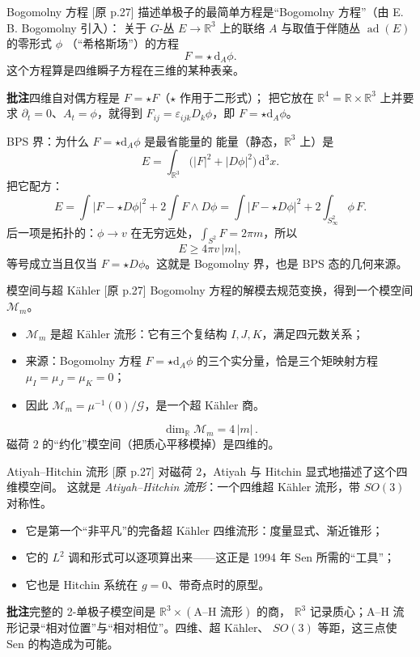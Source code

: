 \documentclass[aspectratio=169,12pt]{ctexbeamer}
\newcommand{\RR}{\mathbb{R}}
\newcommand{\cM}{\mathcal{M}}
\newcommand{\dd}{\mathrm{d}}
\newcommand{\ad}{\operatorname{ad}}
\newcommand{\srcp}[1]{{\color{black!40}\scriptsize[原 p.#1]}}
\begin{document}
\begin{frame}{Bogomolny 方程}
  \srcp{27} 描述单极子的最简单方程是“Bogomolny 方程”（由 E. B. Bogomolny 引入）：
  关于 $G$-丛 $E\to\RR^3$ 上的联络 $A$ 与取值于伴随丛 $\ad(E)$ 的零形式 $\phi$
  （“希格斯场”）的方程
  \[
    F=\star\,\dd_A\phi .
  \]
  这个方程算是四维瞬子方程在三维的某种表亲。
  \begin{beizhu}
  \textbf{批注}\quad 四维自对偶方程是 $F=\star F$（$\star$ 作用于二形式）；
  把它放在 $\RR^4=\RR\times\RR^3$ 上并要求 $\partial_t=0$、$A_t=\phi$，就得到
  $F_{ij}=\varepsilon_{ijk}D_k\phi$，即 $F=\star\dd_A\phi$。
  \end{beizhu}
\end{frame}

\begin{frame}{BPS 界：为什么 $F=\star\dd_A\phi$ 是最省能量的}
  能量（静态，$\RR^3$ 上）是
  \[
    E=\int_{\RR^3}\big(|F|^2+|D\phi|^2\big)\,\dd^3x .
  \]
  把它配方：
  \[
    E=\int|F-\star D\phi|^2+2\int F\wedge D\phi
     =\int|F-\star D\phi|^2+2\int_{S^2_\infty}\phi\,F .
  \]
  后一项是拓扑的：$\phi\to v$ 在无穷远处，$\int_{S^2}F=2\pi m$，所以
  \[
    E\ge 4\pi v\,|m|,
  \]
  等号成立当且仅当 $F=\star D\phi$。这就是 Bogomolny 界，也是 BPS 态的几何来源。
\end{frame}

\begin{frame}{模空间与超 Kähler}
  \srcp{27} Bogomolny 方程的解模去规范变换，得到一个模空间 $\cM_m$。
  \begin{itemize}
    \item $\cM_m$ 是超 Kähler 流形：它有三个复结构 $I,J,K$，满足四元数关系；
    \item 来源：Bogomolny 方程 $F=\star\dd_A\phi$ 的三个实分量，恰是三个矩映射方程
      $\mu_I=\mu_J=\mu_K=0$；
    \item 因此 $\cM_m=\mu^{-1}(0)/\mathcal{G}$，是一个超 Kähler 商。
  \end{itemize}
  \[
    \dim_{\RR}\cM_m=4\,|m|\,.
  \]
  磁荷 $2$ 的“约化”模空间（把质心平移模掉）是四维的。
\end{frame}

\begin{frame}{Atiyah--Hitchin 流形}
  \srcp{27} 对磁荷 $2$，Atiyah 与 Hitchin 显式地描述了这个四维模空间。
  这就是 \emph{Atiyah--Hitchin 流形}：一个四维超 Kähler 流形，带 $SO(3)$ 对称性。
  \begin{itemize}
    \item 它是第一个“非平凡”的完备超 Kähler 四维流形：度量显式、渐近锥形；
    \item 它的 $L^2$ 调和形式可以逐项算出来——这正是 1994 年 Sen 所需的“工具”；
    \item 它也是 Hitchin 系统在 $g=0$、带奇点时的原型。
  \end{itemize}
  \begin{beizhu}
  \textbf{批注}\quad 完整的 2-单极子模空间是 $\RR^3\times(\text{A--H 流形})$ 的商，
  $\RR^3$ 记录质心；A--H 流形记录“相对位置”与“相对相位”。四维、超 Kähler、
  $SO(3)$ 等距，这三点使 Sen 的构造成为可能。
  \end{beizhu}
\end{frame}
\end{document}
